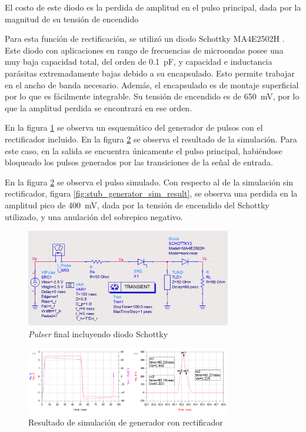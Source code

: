 El costo de este diodo es la perdida de amplitud en el pulso principal, dada por
la magnitud de su tensión de encendido

Para esta función de rectificación, se utilizó un diodo Schottky MA4E2502H
\cite{MA4E2502H-datasheet}. Este diodo con aplicaciones en rango de frecuencias
de microondas posee una muy baja capacidad total, del orden de
\qty{0.1}{\pico\farad}, y capacidad e inductancia parásitas extremadamente bajas
debido a su encapsulado. Esto permite trabajar en el ancho de banda necesario.
Además, el encapsulado es de montaje superficial por lo que es fácilmente
integrable. Su tensión de encendido es de \qty{650}{\milli\volt}, por lo que la
amplitud perdida se encontrará en ese orden.

En la figura \ref{fig:pulser_w_schottky_sch} se observa un esquemático del
generador de pulsos con el rectificador incluido. En la figura
\ref{fig:pulser_w_schottky_sim_result} se observa el resultado de la
simulación. Para este caso, en la salida se encuentra únicamente el pulso
principal, habiéndose bloqueado los pulsos generados por las transiciones de la
señal de entrada.

En la figura \ref{fig:pulser_w_schottky_sim_result} se observa el pulso
simulado. Con respecto al de la simulación sin rectificador, figura
\ref{fig:stub_generator_sim_result}, se observa una perdida en la amplitud pico de
\qty{400}{\milli\volt}, dada por la tensión de encendido del Schottky
utilizado, y una anulación del sobrepico negativo.

\begin{figure}[t!]
    \centering
    \includegraphics[width=0.8\textwidth]{images/pulser_w_schottky_sch.png}
    \caption{\textit{Pulser} final incluyendo diodo Schottky}
    \label{fig:pulser_w_schottky_sch}
\end{figure}

\begin{figure}[t!]
    \centering
    \includegraphics[width=0.8\textwidth]{images/pulser_w_schottky_sim_result.png}
    \caption{Resultado de simulación de generador con rectificador}
    \label{fig:pulser_w_schottky_sim_result}
\end{figure}

